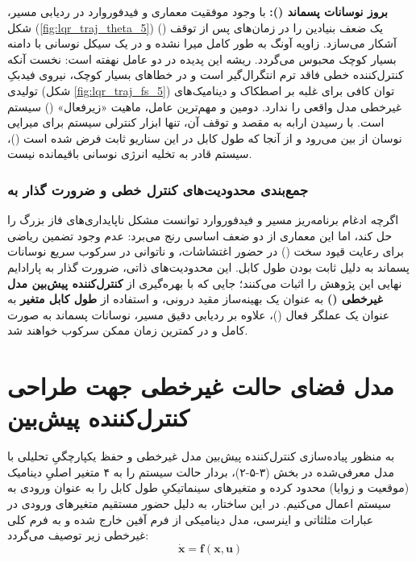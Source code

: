 \textbf{بروز نوسانات پسماند ():}
با وجود موفقیت معماری  و فیدفوروارد در ردیابی مسیر، شکل (\ref{fig:lqr_traj_theta_5}) یک ضعف بنیادین را در زمان‌های پس از توقف () آشکار می‌سازد. زاویه آونگ به طور کامل میرا نشده و در یک سیکل نوسانی با دامنه بسیار کوچک محبوس می‌گردد.
ریشه این پدیده در دو عامل نهفته است: نخست آنکه کنترل‌کننده خطی  فاقد ترم انتگرال‌گیر است و در خطاهای بسیار کوچک، نیروی فیدبکِ تولیدی (شکل \ref{fig:lqr_traj_fs_5}) توان کافی برای غلبه بر اصطکاک و دینامیک‌های غیرخطی مدل واقعی را ندارد. دومین و مهم‌ترین عامل، ماهیت «زیرفعال» () سیستم است. با رسیدن ارابه به مقصد و توقف آن، تنها ابزار کنترلی سیستم برای میرایی نوسان از بین می‌رود و از آنجا که طول کابل در این سناریو ثابت فرض شده است ()، سیستم قادر به تخلیه انرژی نوسانی باقیمانده نیست.

\subsubsection{جمع‌بندی محدودیت‌های کنترل خطی و ضرورت گذار به }
اگرچه ادغام برنامه‌ریز مسیر و فیدفوروارد توانست مشکل ناپایداری‌های فاز بزرگ را حل کند، اما این معماری از دو ضعف اساسی رنج می‌برد: عدم وجود تضمین ریاضی برای رعایت قیود سخت () در حضور اغتشاشات، و ناتوانی در سرکوب سریع نوسانات پسماند به دلیل ثابت بودن طول کابل.
این محدودیت‌های ذاتی، ضرورت گذار به پارادایم نهایی این پژوهش را اثبات می‌کنند؛ جایی که با بهره‌گیری از \textbf{کنترل‌کننده پیش‌بین مدل غیرخطی ()} به عنوان یک بهینه‌ساز مقید درونی، و استفاده از \textbf{طول کابل متغیر} به عنوان یک عملگر فعال ()، علاوه بر ردیابی دقیق مسیر، نوسانات پسماند به صورت کامل و در کمترین زمان ممکن سرکوب خواهند شد.

\section{مدل فضای حالت غیرخطی جهت طراحی کنترل‌کننده پیش‌بین }

به منظور پیاده‌سازی کنترل‌کننده پیش‌بین مدل غیرخطی  و حفظ یکپارچگیِ تحلیلی با مدل معرفی‌شده در بخش (۳-۵-۲)، بردار حالت سیستم را به ۴ متغیر اصلیِ دینامیک (موقعیت و زوایا) محدود کرده و متغیرهای سینماتیکیِ طول کابل را به عنوان ورودی به سیستم اعمال می‌کنیم.
در این ساختار، به دلیل حضور مستقیم متغیرهای ورودی در عبارات مثلثاتی و اینرسی، مدل دینامیکی از فرم آفین خارج شده و به فرم کلی غیرخطی  زیر توصیف می‌گردد:
\[
    \dot{\mathbf{x}} = \mathbf{f}(\mathbf{x}, \mathbf{u})
\]

